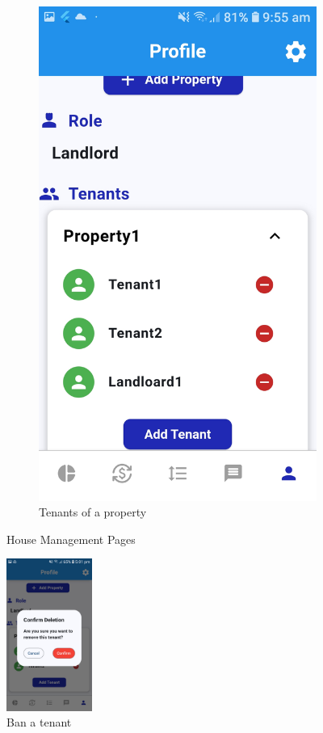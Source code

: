 \documentclass[sigconf,nonacm]{acmart}\settopmatter{printfolios=true}
\begin{document}
\begin{figure}[htbp]
\begin{subfigure}{0.25\textwidth}
    \includegraphics[width=\textwidth]{propertyTenants.jpg}
    \caption{Tenants of a property}
    \label{fig:propertyTenants}
  \end{subfigure}
  \caption{House Management Pages}
\end{figure}

\begin{figure}[htbp]
  \centering
  \includegraphics[width=0.25\textwidth]{banTenant.jpg}
  \caption{Ban a tenant}
  \label{fig:banTenant}
\end{figure}
\end{document}

